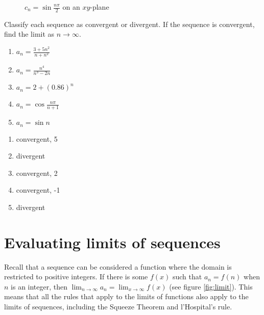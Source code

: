 \begin{figure}[htbp]
\centering
    \caption{$c_n =\sin{\frac{n\pi}{2}}$ on an $xy$-plane}
    \label{fig:sineseq}
\end{figure}

\begin{Exercise}[label=seqcalc3]
Classify each sequence as convergent or divergent. If the sequence is 
convergent, find the limit as $n \to \infty$.
\begin{enumerate}
\item $a_n = \frac{3 + 5n^2}{n + n^2}$
\item $a_n = \frac{n^4}{n^3 - 2n}$
\item $a_n = 2 + (0.86)^n$
\item $a_n = \cos{\frac{n\pi}{n+1}}$
\item $a_n = \sin{n}$
\end{enumerate}
\end{Exercise}

\begin{Answer}[ref=seqcalc3]
\begin{enumerate}
\item convergent, 5
\item divergent
\item convergent, 2
\item convergent, -1
\item divergent
\end{enumerate}
\end{Answer}

\section{Evaluating limits of sequences}
Recall that a sequence can be considered a function where the domain is 
restricted to positive integers. If there is some $f(x)$ such that $a_n = f(n)$ 
when $n$ is an integer, then $\lim_{n \to \infty} a_n = \lim_{x \to \infty} 
f(x)$ (see figure \ref{fig:limit}). This means that all the rules that apply to 
the limits of functions also apply to the limits of sequences, including the 
Squeeze Theorem and l'Hospital's rule. 

